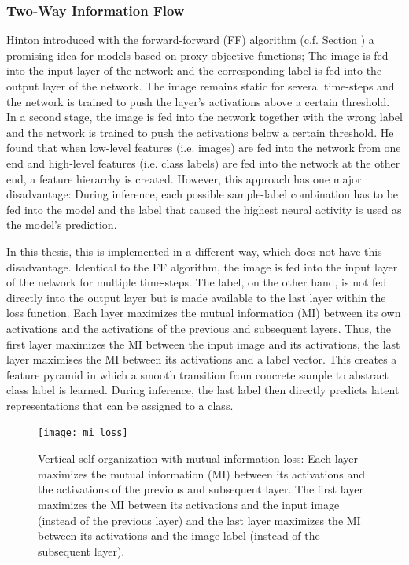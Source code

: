 \subsubsection{Two-Way Information Flow}
Hinton  introduced with the forward-forward (FF) algorithm (c.f. Section ) a promising idea for models based on proxy objective functions; 
The image is fed into the input layer of the network and the corresponding label is fed into the output layer of the network. The image remains static for several time-steps and the network is trained to push the layer's activations above a certain threshold. In a second stage, the image is fed into the network together with the wrong label and the network is trained to push the activations below a certain threshold. He found that when low-level features (i.e. images) are fed into the network from one end and high-level features (i.e. class labels) are fed into the network at the other end, a feature hierarchy is created. However, this approach has one major disadvantage: During inference, each possible sample-label combination has to be fed into the model and the label that caused the highest neural activity is used as the model's prediction.

In this thesis, this is implemented in a different way, which does not have this disadvantage. Identical to the FF algorithm, the image is fed into the input layer of the network for multiple time-steps. The label, on the other hand, is not fed directly into the output layer but is made available to the last layer within the loss function. Each layer maximizes the mutual information (MI) between its own activations and the activations of the previous and subsequent layers. Thus, the first layer maximizes the MI between the input image and its activations, the last layer maximises the MI between its activations and a label vector. This creates a feature pyramid in which a smooth transition from concrete sample to abstract class label is learned. During inference, the last label then directly predicts latent representations that can be assigned to a class.

\begin{figure}[h]
    \centering
    \texttt{[image: mi\_loss]}
    \caption[Vertical self-organization with mutual information loss]{Vertical self-organization with mutual information loss: Each layer maximizes the mutual information (MI) between its activations and the activations of the previous and subsequent layer. The first layer maximizes the MI between its activations and the input image (instead of the previous layer) and the last layer maximizes the MI between its activations and the image label (instead of the subsequent layer).}
\end{figure}

